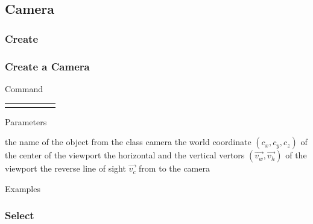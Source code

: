 \documentclass[9pt]{beamer}
\begin{document}
\subsection{Camera}

\subsubsection{Create}

\begin{frame}[t] \frametitle{Create a Camera}

	\begin{block}{Command} 
		\begin{tabularx}{\textwidth}{@{}l@{}l@{}l@{}l@{}l@{}R}
			 &
				 &
				 &
				 &
				 & \InstrItem
		\end{tabularx}
	\end{block}

	\begin{block}{Parameters} \begin{itemize}
		   the name of the object from the class camera
		    the world coordinate $(c_x, c_y, c_z)$ of the center of the viewport
		     the horizontal and the vertical vertors $(\vec{v_w}, \vec{v_h})$ of the viewport
		     the reverse line of sight $\vec{v_c}$ from  to the camera
	\end{itemize} \end{block}

	\begin{block}{Examples}
	\end{block}

\end{frame}

\subsubsection{Select}
\end{document}
